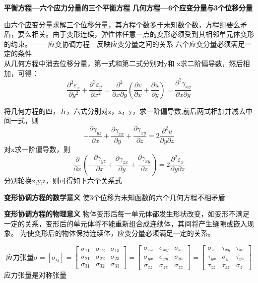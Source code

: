 \documentclass{article}
\begin{document}
\textbf{平衡方程—六个应力分量的三个平衡方程}
\textbf{几何方程—6个应变分量与3个位移分量}

由六个应变分量求解三个位移分量，其方程个数多于未知数个数，方程组要么矛盾，要么相关。由于变形连续，弹性体任意一点的变形必须受到其相邻单元体变形的约束。
——应变协调方程—反映应变分量之间的关系
六个应变分量必须满足一定的条件\\

从几何方程中消去位移分量，第一式和第二式分别对y和 x求二阶偏导数，然后相加，可得：
$$
\frac{\partial^2 \varepsilon_x }{\partial y^2} + \frac{\partial^2 \varepsilon_y }{\partial x^2} =
\frac{\partial^2}{\partial x \partial y}(\frac{\partial v}{\partial x}+\frac{\partial u}{\partial y})=
\frac{\partial^2 \gamma_{xy}}{\partial x\partial y}
$$

将几何方程的四，五，六式分别对z，x，y，求一阶偏导数,前后两式相加并减去中间一式，则
$$
- \frac{\partial \gamma_{yz}}{\partial x} +\frac{\partial \gamma_{zx}}{\partial y} +\frac{\partial \gamma_{xy}}{\partial z}
=2 \frac{\partial ^2 u}{\partial y \partial z}
$$
对x求一阶偏导数，则
$$
\frac{\partial}{\partial x}(- \frac{\partial \gamma_{yz}}{\partial x} +\frac{\partial \gamma_{zx}}{\partial y} +\frac{\partial \gamma_{xy}}{\partial z} ) = 2 \frac{\partial^2 \varepsilon_x}{\partial y\partial z}
$$
分别轮换x,y,z，则可得如下六个关系式

\textbf{变形协调方程的数学意义}
使3个位移为未知函数的六个几何方程不相矛盾

\textbf{变形协调方程的物理意义}
物体变形后每一单元体都发生形状改变，如变形不满足一定的关系，变形后的单元体将不能重新组合成连续体，其间将产生缝隙或嵌入现象。
为使变形后的物体保持连续体，应变分量必须满足一定的关系。

\begin{equation}
\text{应力张量}
\sigma=
[\sigma_{ij}]=
\left[
  \begin{array}{ccc}
  \sigma_{11} & \sigma_{12} & \sigma_{13} \\
  \sigma_{21} & \sigma_{22} & \sigma_{23} \\
  \sigma_{31} & \sigma_{32} & \sigma_{33}
  \end{array}
\right]
=
\left[
  \begin{array}{ccc}
  \sigma_{xx} & \sigma_{xy} & \sigma_{xz} \\
  \sigma_{yx} & \sigma_{yy} & \sigma_{yz} \\
  \sigma_{zz} & \sigma_{zz} & \sigma_{zz}
  \end{array}
\right]
=
\left[
  \begin{array}{ccc}
  \sigma_{x} & \tau_{xy} & \tau_{xz} \\
  \tau_{yx} & \sigma_{y} & \tau_{yz} \\
  \tau_{zz} & \tau_{zz} & \sigma_{z}
  \end{array}
\right]
\end{equation}
应力张量是对称张量
\end{document}
